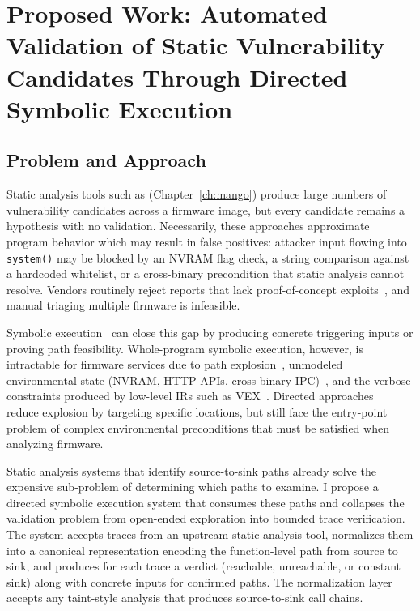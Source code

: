 \chapter{Proposed Work: Automated Validation of Static Vulnerability Candidates Through Directed Symbolic Execution}
\label{ch:proposed}

\section{Problem and Approach}
\label{sec:proposed-approach}

Static analysis tools such as \mango (Chapter~\ref{ch:mango}) produce large numbers of vulnerability candidates across a firmware image, but every candidate remains a hypothesis with no validation.
Necessarily, these approaches approximate program behavior which may result in false positives: attacker input flowing into \texttt{system()} may be blocked by an NVRAM flag check, a string comparison against a hardcoded whitelist, or a cross-binary precondition that static analysis cannot resolve.
Vendors routinely reject reports that lack proof-of-concept exploits~\cite{gibbs2024mango}, and manual triaging multiple firmware is infeasible.

Symbolic execution~\cite{king1976symbolic} can close this gap by producing concrete triggering inputs or proving path feasibility.
Whole-program symbolic execution, however, is intractable for firmware services due to path explosion~\cite{krishnamoorthy2010tackling}, unmodeled environmental state (NVRAM, HTTP APIs, cross-binary IPC)~\cite{greenhouse}, and the verbose constraints produced by low-level IRs such as VEX~\cite{nethercote2007valgrind}.
Directed approaches~\cite{ma2011directed,vadayath2022arbiter} reduce explosion by targeting specific locations, but still face the entry-point problem of complex environmental preconditions that must be satisfied when analyzing firmware.

Static analysis systems that identify source-to-sink paths already solve the expensive sub-problem of determining which paths to examine.
I propose a directed symbolic execution system that consumes these paths and collapses the validation problem from open-ended exploration into bounded trace verification.
The system accepts traces from an upstream static analysis tool, normalizes them into a canonical representation encoding the function-level path from source to sink, and produces for each trace a verdict (reachable, unreachable, or constant sink) along with concrete inputs for confirmed paths.
The normalization layer accepts any taint-style analysis that produces source-to-sink call chains.

